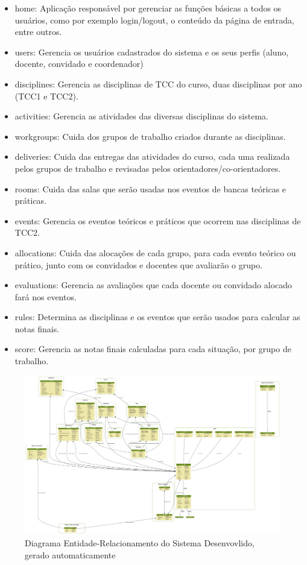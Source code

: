 \begin{itemize}
    \item home: Aplicação responsável por gerenciar as funções básicas a todos os usuários, como por exemplo login/logout, o conteúdo da página de entrada, entre outros.
    \item users: Gerencia os usuários cadastrados do sistema e os seus perfis (aluno, docente, convidado e coordenador)
    \item disciplines: Gerencia as disciplinas de TCC do curso, duas disciplinas por ano (TCC1 e TCC2).
    \item activities: Gerencia as atividades das diversas disciplinas do sistema.
    \item workgroups: Cuida dos grupos de trabalho criados durante as disciplinas. 
    \item deliveries: Cuida das entregas das atividades do curso, cada uma realizada pelos grupos de trabalho e revisadas pelos orientadores/co-orientadores.
    \item rooms: Cuida das salas que serão usadas nos eventos de bancas teóricas e práticas.
    \item events: Gerencia os eventos teóricos e práticos que ocorrem nas disciplinas de TCC2.
    \item allocations: Cuida das alocações de cada grupo, para cada evento teórico ou prático, junto com os convidados e docentes que avaliarão o grupo.
    \item evaluations: Gerencia as avaliações que cada docente ou convidado alocado fará nos eventos.
    \item rules: Determina as disciplinas e os eventos que serão usados para calcular as notas finais.
    \item score: Gerencia as notas finais calculadas para cada situação, por grupo de trabalho.
\end{itemize}

\begin{figure}[H]
    \centering
    \includegraphics[angle=90, origin=c, scale=0.3]{imagens/output.png}
    \caption{Diagrama Entidade-Relacionamento do Sistema Desenvovlido, gerado automaticamente}
    \label{fig:output}
\end{figure}